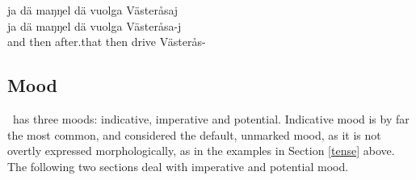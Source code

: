 \z
\ea\label{presentEx3}%
\glll	ja dä maŋŋel dä vuolga Västeråsaj\\
	ja dä maŋŋel dä vuolga Västeråsa-j\\
	and then after.that then drive\BS{} Västerås-\\\nopagebreak
{}	
\z
{}


\subsection{Mood}\label{mood}
\PS\ has three moods: indicative, imperative and potential. Indicative mood is by far the most common, and considered the default, unmarked mood, as it is not overtly expressed morphologically, as in the examples in Section \ref{tense} above. 
The following two sections deal with imperative and potential mood. %

